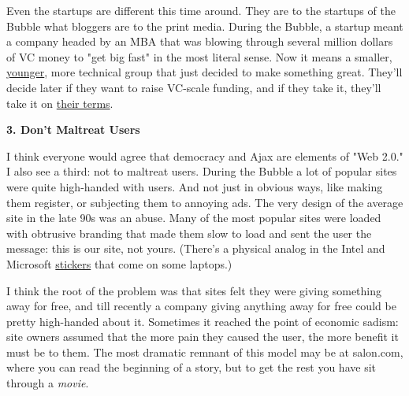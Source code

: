 Even the startups are different this time
                    around. They are to the startups of the Bubble what bloggers
                    are to the print media. During the Bubble, a startup meant a
                    company headed by an MBA that was blowing through several
                    million dollars of VC money to "get big fast" in the most
                    literal sense. Now it means a smaller,
                    \href{http://www.paulgraham.com/hiring.html}{younger}, more technical group that
                    just decided to make something great. They'll decide later
                    if they want to raise VC-scale funding, and if they take it,
                    they'll take it on
                    \href{http://www.paulgraham.com/vcsqueeze.html}{their terms}.

\textbf{3. Don't Maltreat Users}

I think everyone would agree that democracy and
                    Ajax are elements of "Web 2.0." I also see a third: not to
                    maltreat users. During the Bubble a lot of popular sites
                    were quite high-handed with users. And not just in obvious
                    ways, like making them register, or subjecting them to
                    annoying ads. The very design of the average site in the
                    late 90s was an abuse. Many of the most popular sites were
                    loaded with obtrusive branding that made them slow to load
                    and sent the user the message: this is our site, not yours.
                    (There's a physical analog in the Intel and Microsoft
                    \href{http://www.paulgraham.com/designedforwindows.html}{stickers} that come on
                    some laptops.)

I think the root of the problem
                    was that sites felt they were giving something away for
                    free, and till recently a company giving anything away for
                    free could be pretty high-handed about it. Sometimes it
                    reached the point of economic sadism: site owners assumed
                    that the more pain they caused the user, the more benefit it
                    must be to them. The most dramatic remnant of this model may
                    be at salon.com, where you can read the beginning of a
                    story, but to get the rest you have sit through a
                    \emph{movie}.

